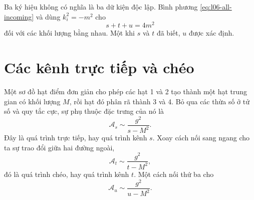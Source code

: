 Ba ký hiệu không có nghĩa là ba dữ kiện độc lập. Bình phương \eqref{eq:l06-all-incoming} và dùng \(k_i^2=-m^2\) cho
\begin{equation}
  s+t+u=4m^2
  \label{eq:l06-stu-constraint}
\end{equation}
đối với các khối lượng bằng nhau. Một khi \(s\) và \(t\) đã biết, \(u\) được xác định.

\begin{classroomqa}
\end{classroomqa}

\begin{classroomqa}
\end{classroomqa}

\section{Các kênh trực tiếp và chéo}

Một sơ đồ hạt điểm đơn giản cho phép các hạt 1 và 2 tạo thành một hạt trung gian có khối lượng \(M\), rồi hạt đó phân rã thành 3 và 4. Bỏ qua các thừa số ở tử số và quy tắc cực, sự phụ thuộc đặc trưng của nó là
\begin{equation}
  \mathcal A_s\sim\frac{g^2}{s-M^2}.
  \label{eq:l06-s-channel}
\end{equation}
Đây là quá trình trực tiếp, hay quá trình kênh \(s\). Xoay cách nối sang ngang cho ta sự trao đổi giữa hai đường ngoài,
\begin{equation}
  \mathcal A_t\sim\frac{g^2}{t-M^2},
  \label{eq:l06-t-channel}
\end{equation}
đó là quá trình chéo, hay quá trình kênh \(t\). Một cách nối thứ ba cho
\begin{equation}
  \mathcal A_u\sim\frac{g^2}{u-M^2}.
  \label{eq:l06-u-channel}
\end{equation}


